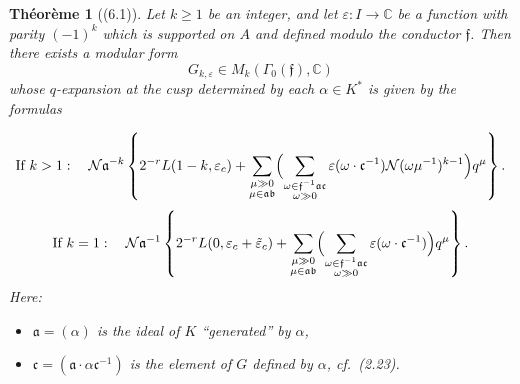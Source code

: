 \documentclass[12pt,a4paper]{article}
\theoremstyle{plain}
\newtheorem{theorem}{Th\'{e}or\`{e}me}[section]
\theoremstyle{definition}
\theoremstyle{remark}
\begin{document}
\begin{theorem}[(6.1)]\label{thm:6.1}
Let $k \ge 1$ be an integer, and let $\varepsilon: I \to \mathbb{C}$ be a function with parity $(-1)^k$ which is supported on $A$ and defined modulo the conductor $\mathfrak{f}$. Then there exists a modular form
\[
G_{k,\varepsilon} \in M_k(\Gamma_0(\mathfrak{f}), \mathbb{C})
\]
whose $q$-expansion at the cusp determined by each $\alpha \in K^*$ is given by the formulas

\begin{equation}\label{eq:6.2}
\text{If } k > 1:\quad \mathcal{N}\mathfrak{a}^{-k}\left\{2^{-r}L(1-k, \varepsilon_c) + \sum_{\substack{\mu \gg 0 \\ \mu \in \mathfrak{a}\mathfrak{b}}} \Bigl(\sum_{\substack{\omega \in \mathfrak{f}^{-1}\mathfrak{a}\mathfrak{c} \\ \omega \gg 0}} \varepsilon(\omega \cdot \mathfrak{c}^{-1}) \mathcal{N}(\omega\mu^{-1})^{k-1}\Bigr) q^\mu\right\}.
\end{equation}
\begin{equation}\label{eq:6.2-k1}
\text{If } k = 1:\quad \mathcal{N}\mathfrak{a}^{-1}\left\{2^{-r}L(0, \varepsilon_c + \tilde{\varepsilon}_c) + \sum_{\substack{\mu \gg 0 \\ \mu \in \mathfrak{a}\mathfrak{b}}} \Bigl(\sum_{\substack{\omega \in \mathfrak{f}^{-1}\mathfrak{a}\mathfrak{c} \\ \omega \gg 0}} \varepsilon(\omega \cdot \mathfrak{c}^{-1})\Bigr) q^\mu\right\}.
\end{equation}
Here:
\begin{itemize}
\item $\mathfrak{a} = (\alpha)$ is the ideal of $K$ ``generated'' by $\alpha$,
\item $\mathfrak{c} = (\mathfrak{a} \cdot \alpha\mathfrak{c}^{-1})$ is the element of $G$ defined by $\alpha$, cf.~(2.23).
\end{itemize}
\end{theorem}
\end{document}
